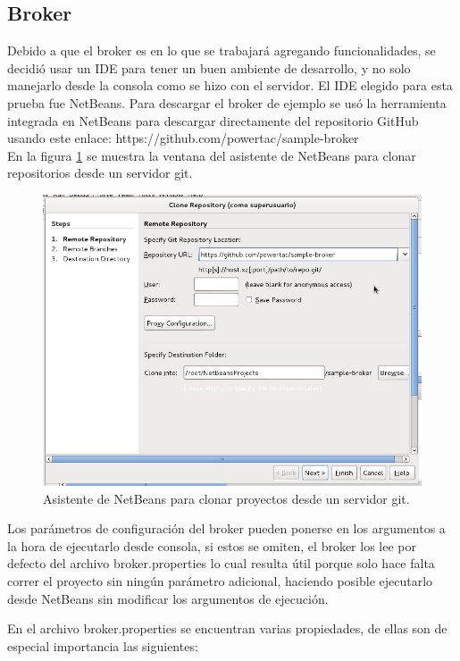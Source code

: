 \subsection{Broker}
Debido a que el broker es en lo que se trabajará agregando funcionalidades, se decidió usar un IDE para tener un buen ambiente de desarrollo, y no solo manejarlo desde la consola como se hizo con el servidor. El IDE elegido para esta prueba fue NetBeans.
Para descargar el broker de ejemplo se usó la herramienta integrada en NetBeans para descargar directamente del repositorio GitHub usando este enlace: \textsf{https://github.com/powertac/sample-broker}\\
En la figura \ref{fig:asistenteNetbeansClonar} se muestra la ventana del asistente de NetBeans para clonar repositorios desde un servidor git.

\begin{figure}[h]
	\centering
	\includegraphics[width=13cm]{img/asistenteNetbeansClonar.png}
	\caption{Asistente de NetBeans para clonar proyectos desde un servidor git.}
	\label{fig:asistenteNetbeansClonar}
\end{figure}

Los parámetros de configuración del broker pueden ponerse en los argumentos a la hora de ejecutarlo desde consola, si estos se omiten, el broker los lee por defecto del archivo broker.properties lo cual resulta útil porque solo hace falta correr el proyecto sin ningún parámetro adicional, haciendo posible ejecutarlo desde NetBeans sin modificar los argumentos de ejecución.

En el archivo broker.properties se encuentran varias propiedades, de ellas son de especial importancia las siguientes:\\

